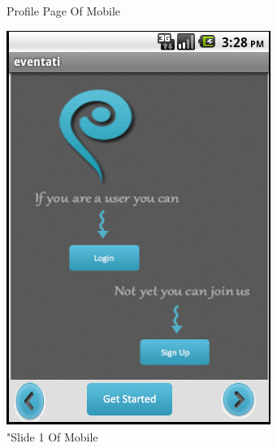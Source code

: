 \documentclass[12pt,a4paper,class,twoside,openany]{report}
\begin{document}
{\begin{figure}
\begin{minipage}[b]{0.5\linewidth}
	\caption{Profile Page Of Mobile }
	\label{fg:8-12}
	\end{minipage}
	\end{figure}
\begin{figure}
	\begin{minipage}[b]{0.5\linewidth}
	\centering
	\includegraphics[height=4 in]{8-13}
	\caption{"Slide 1 Of Mobile}
     \label{fg:8-13}
	\end{minipage}
	\hspace{0.5cm}
	\begin{minipage}[b]{0.5\linewidth}
	\centering

\end{minipage}
\end{figure}}
\end{document}
